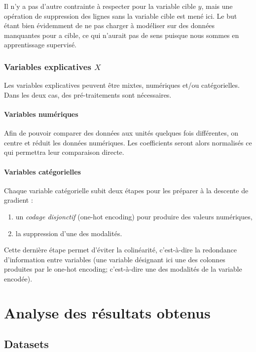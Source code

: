 \documentclass[10pt,french]{report}
\begin{document}
	Il n'y a pas d'autre contrainte à respecter pour la variable cible $y$, mais une opération de suppression des lignes sans la variable cible est mené ici. Le but étant bien évidemment de ne pas charger à modéliser sur des données manquantes pour a cible, ce qui n'aurait pas de sens puisque nous sommes en apprentissage supervisé.

	\subsection{Variables explicatives $X$}

	Les variables explicatives peuvent être mixtes, numériques et/ou catégorielles. Dans les deux cas, des pré-traitements sont nécessaires.

	\subsubsection{Variables numériques}

	Afin de pouvoir comparer des données aux unités quelques fois différentes, on centre et réduit les données numériques. Les coefficients seront alors normalisés ce qui permettra leur comparaison directe.

	\subsubsection{Variables catégorielles}

	Chaque variable catégorielle subit deux étapes pour les préparer à la descente de gradient :

	\begin{enumerate}
		\item un \textit{codage disjonctif} (one-hot encoding) pour produire des valeurs numériques,
		\item la suppression d'une des modalités.
	\end{enumerate}

	Cette dernière étape permet d'éviter la colinéarité, c'est-à-dire la redondance d'information entre variables (une variable désignant ici une des colonnes produites par le one-hot encoding; c'est-à-dire une des modalités de la variable encodée).

    \chapter{Analyse des résultats obtenus}

    \section{Datasets}
\end{document}
